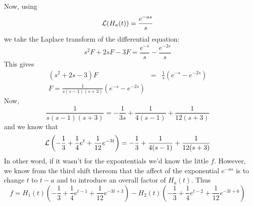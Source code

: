 \documentclass[12pt]{article}
\begin{document}
\begin{enumerate}
Now, using
\begin{equation}
{\cal L}(H_a(t))=\frac{e^{-as}}{s}
\end{equation}
we take the Laplace transform of the differential equation:
\begin{equation}
s^2F+2sF-3F=\frac{e^{-s}}{s}-\frac{e^{-2s}}{s}
\end{equation}
This gives
\begin{eqnarray}
(s^2+2s-3)F&=&\frac{1}{s}\left(e^{-s}-e^{-2s}\right)\nonumber\\
          F=\frac{1}{s(s-1)(s+3)}\left(e^{-s}-e^{-2s}\right)
\end{eqnarray}
Now, 
\begin{equation}
\frac{1}{s(s-1)(s+3)}=-\frac{1}{3s}+\frac{1}{4(s-1)}+\frac{1}{12(s+3)}
\end{equation}
and we know that 
\begin{equation}
{\cal L}\left(-\frac{1}{3}+\frac{1}{4}e^t+\frac{1}{12}e^{-3t}\right)
=-\frac{1}{3}+\frac{1}{4(s-1)}+\frac{1}{12(s+3)}
\end{equation}
In other word, if it wasn't for the expontentials we'd know the little $f$. However, we know from the third shift thereom that the affect of the exponential $e^{-as}$ is to change $t$ to $t-a$ and to introduce an overall factor of $H_a(t)$. Thus
\begin{equation}
f=H_1(t)\left(-\frac{1}{3}+\frac{1}{4}e^{t-1}+\frac{1}{12}e^{-3t+3}\right)
-H_2(t)\left(-\frac{1}{3}+\frac{1}{4}e^{t-2}+\frac{1}{12}e^{-3t+6}\right)
\end{equation}
\end{enumerate}

\vfill

\noindent
\end{document}

